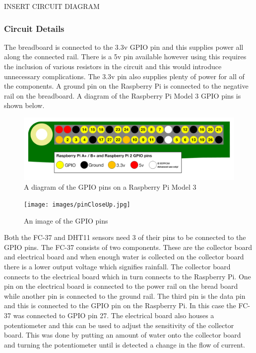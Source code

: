 \documentclass[10pt,a4paper]{article}
\begin{document}
INSERT CIRCUIT DIAGRAM

\subsubsection{Circuit Details}
The breadboard is connected to the 3.3v GPIO pin and this supplies power all along the connected rail. There is a 5v pin available however using this requires the inclusion of various resistors in the circuit and this would introduce unnecessary complications. The 3.3v pin also supplies plenty of power for all of the components. A ground pin on the Raspberry Pi is connected to the negative rail on the breadboard. A diagram of the Raspberry Pi Model 3 GPIO pins is shown below. 
\begin{figure}[H]
  \centering
    \includegraphics[width=\linewidth]{images/gpio-pins.png}
    \caption{A diagram of the GPIO pins on a Raspberry Pi Model 3}
    \label{fig:gpiopins}
\end{figure}

\begin{figure}[H]
  \centering
    \texttt{[image: images/pinCloseUp.jpg]}
    \caption{An image of the GPIO pins}
    \label{fig:pinCloseUp}
\end{figure}

Both the FC-37 and DHT11 sensors need 3 of their pins to be connected to the GPIO pins. The FC-37 consists of two components. These are the collector board and electrical board and when enough water is collected on the collector board there is a lower output voltage which signifies rainfall. The collector board connects to the electrical board which in turn connects to the Raspberry Pi. One pin on the electrical board is connected to the power rail on the bread board while another pin is connected to the ground rail. The third pin is the data pin and this is connected to the GPIO pin on the Raspberry Pi. In this case the FC-37 was connected to GPIO pin 27. The electrical board also houses a potentiometer and this can be used to adjust the sensitivity of the collector board. This was done by putting an amount of water onto the collector board and turning the potentiometer until is detected a change in the flow of current.
\end{document}
